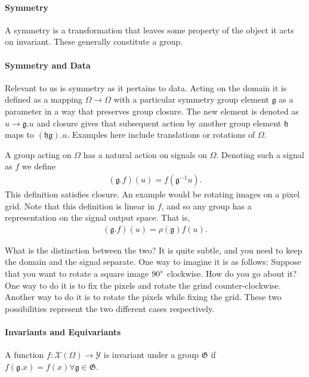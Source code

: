 \paragraph{Symmetry}
A symmetry is a transformation that leaves some property of the object it acts on invariant. These generally constitute a group.

\paragraph{Symmetry and Data}
Relevant to us is symmetry as it pertains to data. Acting on the domain it is defined as a mapping $\Omega\to\Omega$ with a particular symmetry group element $\mathfrak{g}$ as a parameter in a way that preserves group closure. The new element is denoted as $u\to\mathfrak{g}.u$ and closure gives that subsequent action by another group element $\mathfrak{h}$ maps to $(\mathfrak{h}\mathfrak{g}).u$. Examples here include translations or rotations of $\Omega$.

A group acting on $\Omega$ has a natural action on signals on $\Omega$. Denoting such a signal as $f$ we define
\begin{align}
  (\mathfrak{g}.f)(u) = f(\mathfrak{g}^{-1}u).
\end{align}
This definition satisfies closure. An example would be rotating images on a pixel grid. Note that this definition is linear in $f$, and so any group has a representation on the signal output space. That is,
\begin{align}
  (\mathfrak{g}.f)(u) = \rho(\mathfrak{g})f(u).
\end{align}

What is the distinction between the two? It is quite subtle, and you need to keep the domain and the signal separate. One way to imagine it is as follows: Suppose that you want to rotate a square image $90\degree$ clockwise. How do you go about it? One way to do it is to fix the pixels and rotate the grind counter-clockwise. Another way to do it is to rotate the pixels while fixing the grid. These two possibilities represent the two different cases respectively.

\paragraph{Invariants and Equivariants}
A function $f: \mathcal{X}(\Omega)\to\mathcal{Y}$ is invariant under a group $\mathfrak{G}$ if $f(\mathfrak{g}.x) = f(x)\forall\mathfrak{g}\in\mathfrak{G}$.

